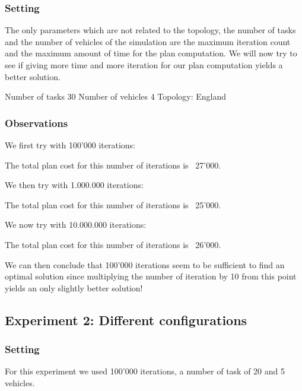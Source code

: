 \documentclass[11pt]{article}
\begin{document}
\subsubsection{Setting}
The only parameters which are not related to the topology, the number
of tasks and the number of vehicles of the simulation are the maximum
iteration count and the maximum amount of time for the plan
computation. We will now try to see if giving more time and more
iteration for our plan computation yields a better solution.

Number of tasks 30
Number of vehicles 4
Topology: England

\subsubsection{Observations}
We first try with 100'000 iterations:

The total plan cost for this number of iterations is ~27'000.

We then try with 1.000.000 iterations:

The total plan cost for this number of iterations is ~25'000.

We now try with 10.000.000 iterations:

The total plan cost for this number of iterations is ~26'000.

We can then conclude that 100'000 iterations seem to be sufficient
to find an optimal solution since multiplying the number of iteration
by 10 from this point yields an only slightly better solution!

\subsection{Experiment 2: Different configurations}

\subsubsection{Setting}

For this experiment we used 100'000 iterations, a number of task of 20
and 5 vehicles.
\end{document}
